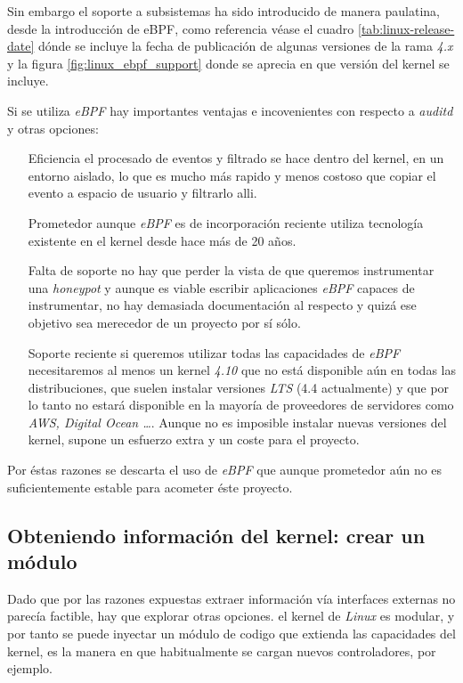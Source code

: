 Sin embargo el soporte a subsistemas ha sido introducido de manera paulatina, desde la introducción de eBPF, como referencia véase el cuadro \ref{tab:linux-release-date} dónde se incluye la fecha de publicación de algunas versiones de la rama
\emph{4.x} y la figura \ref{fig:linux_ebpf_support} donde se aprecia en que versión del kernel se incluye.

\clearpage


Si se utiliza \emph{eBPF} hay importantes ventajas e incovenientes con respecto a \emph{auditd} y otras opciones:
\begin{enumerate}
    \item[Eficiencia] el procesado de eventos y filtrado se hace dentro del kernel, en un entorno aislado, lo que es mucho más
    rapido y menos costoso que copiar el evento a espacio de usuario y filtrarlo alli.
    \item[Prometedor] aunque \emph{eBPF} es de incorporación reciente utiliza tecnología existente en el kernel desde hace más de 20 años.
    \item[Falta de soporte] no hay que perder la vista de que queremos instrumentar una \emph{honeypot} y aunque es viable escribir aplicaciones \emph{eBPF} capaces de instrumentar, no hay demasiada documentación al respecto
    y quizá ese objetivo sea merecedor de un proyecto por sí sólo.
    \item[Soporte reciente] si queremos utilizar todas las capacidades de \emph{eBPF} necesitaremos al menos un kernel \emph{4.10} que no está disponible aún en todas las distribuciones, que suelen instalar
    versiones \emph{LTS} (4.4 actualmente) y que por lo tanto no estará disponible en la mayoría de proveedores de servidores como \emph{AWS, Digital Ocean \ldots}. Aunque no es imposible instalar nuevas versiones del kernel,
    supone un esfuerzo extra y un coste para el proyecto.
\end{enumerate}

Por éstas razones se descarta el uso de \emph{eBPF} que aunque prometedor aún no es suficientemente estable para acometer éste proyecto.
\clearpage

\subsection{Obteniendo información del kernel: crear un módulo}
\label{subsec:kernel-modulo}

Dado que por las razones expuestas extraer información vía interfaces externas no parecía factible, hay que explorar otras opciones.
el kernel de \emph{Linux} es modular, y por tanto se puede inyectar un módulo de codigo que extienda las capacidades del kernel, es la manera
en que habitualmente se cargan nuevos controladores, por ejemplo.

